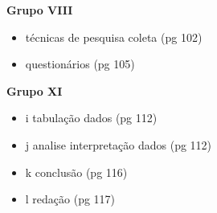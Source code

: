 \documentclass[a4paper]{article}
\begin{document}
\begin{multicols}{2}
{\bf Grupo VIII}
\begin{itemize}
\item técnicas de pesquisa coleta (pg 102)
\item questionários (pg 105)
\end{itemize}

{\bf Grupo XI}
\begin{itemize}
\item i tabulação dados (pg 112)
\item j analise interpretação dados (pg 112)
\item k conclusão (pg 116)
\item l redação (pg 117)
\end{itemize}

\end{multicols}
\end{document}
